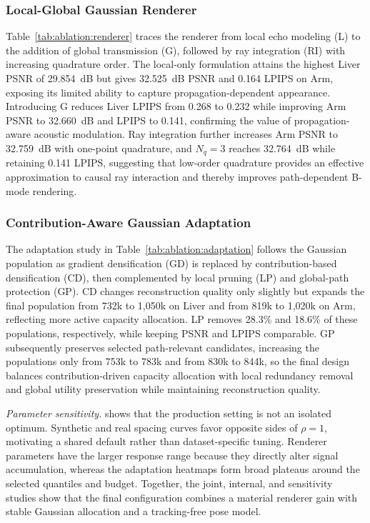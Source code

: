 

\subsubsection{Local-Global Gaussian Renderer}

Table~\ref{tab:ablation:renderer} traces the renderer from local echo modeling
(L) to the addition of global transmission (G), followed by ray integration
(RI) with increasing quadrature order. The local-only formulation attains the
highest Liver PSNR of 29.854~dB but gives 32.525~dB PSNR and 0.164 LPIPS on
Arm, exposing its limited ability to capture propagation-dependent appearance.
Introducing G reduces Liver LPIPS from 0.268 to 0.232 while improving Arm PSNR
to 32.660~dB and LPIPS to 0.141, confirming the value of propagation-aware
acoustic modulation. Ray integration further increases Arm PSNR to
32.759~dB with one-point quadrature, and $N_q=3$ reaches 32.764~dB while
retaining 0.141 LPIPS, suggesting that low-order quadrature provides an
effective approximation to causal ray interaction and thereby improves
path-dependent B-mode rendering.



\subsubsection{Contribution-Aware Gaussian Adaptation}

The adaptation study in Table~\ref{tab:ablation:adaptation} follows the
Gaussian population as gradient densification (GD) is replaced by
contribution-based densification (CD), then complemented by local pruning (LP)
and global-path protection (GP). CD changes reconstruction quality only
slightly but expands the final population from 732k to 1,050k on Liver and
from 819k to 1,020k on Arm, reflecting more active capacity allocation. LP
removes 28.3\% and 18.6\% of these populations, respectively, while keeping
PSNR and LPIPS comparable. GP subsequently preserves selected path-relevant
candidates, increasing the populations only from 753k to 783k and from 830k
to 844k, so the final design balances contribution-driven capacity allocation
with local redundancy removal and global utility preservation while
maintaining reconstruction quality.


\noindent\textit{Parameter sensitivity.}
 shows that the production setting is
not an isolated optimum. Synthetic and real spacing curves favor opposite sides
of $\rho=1$, motivating a shared default rather than dataset-specific tuning.
Renderer parameters have the larger response range because they directly alter
signal accumulation, whereas the adaptation heatmaps form broad plateaus around
the selected quantiles and budget. Together, the joint, internal, and
sensitivity studies show that the final configuration combines a material
renderer gain with stable Gaussian allocation and a tracking-free pose model.


